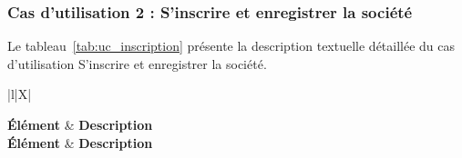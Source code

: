 \subsubsection{Cas d'utilisation 2 : S'inscrire et enregistrer la société}
Le tableau~\ref{tab:uc_inscription} présente la description textuelle détaillée du 
cas d'utilisation \og{}S'inscrire et enregistrer la société\fg{}.

\vspace{0.2cm}
\begin{xltabular}{\textwidth}{|l|X|}
    
    \hline
     \textbf{Élément} & \textbf{Description} \\ \hline
    \endfirsthead
    \hline
     \textbf{Élément} & \textbf{Description} \\ \hline
    \endhead
    \hline
    \endfoot
    \endfoot
    \endlastfoot


\end{xltabular}
